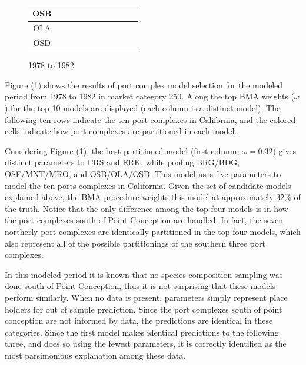 \documentclass[12pt]{article}
\begin{document}
\begin{figure}[h!]
\begin{tabular}{|c|c|c|c|c|c|c|c|c|c|c|}
        OSB&\cellcolor[HTML]{FF7F00}&\cellcolor[HTML]{FF7F00}&\cellcolor[HTML]{FF7F00}&\cellcolor[HTML]{FF7F00}&\cellcolor[HTML]{FF7F00}&\cellcolor[HTML]{FF7F00}&\cellcolor[HTML]{FF7F00}&\cellcolor[HTML]{FF7F00}&\cellcolor[HTML]{984EA3}&\cellcolor[HTML]{FF7F00} \\ \hline%
        OLA&\cellcolor[HTML]{FF7F00}&\cellcolor[HTML]{FFFF33}&\cellcolor[HTML]{FF7F00}&\cellcolor[HTML]{FFFF33}&\cellcolor[HTML]{FF7F00}&\cellcolor[HTML]{FFFF33}&\cellcolor[HTML]{FFFF33}&\cellcolor[HTML]{FFFF33}&\cellcolor[HTML]{FF7F00}&\cellcolor[HTML]{FF7F00} \\ \hline%
        OSD&\cellcolor[HTML]{FF7F00}&\cellcolor[HTML]{FFFF33}&\cellcolor[HTML]{FFFF33}&\cellcolor[HTML]{A65628}&\cellcolor[HTML]{FFFF33}&\cellcolor[HTML]{FFFF33}&\cellcolor[HTML]{A65628}&\cellcolor[HTML]{FFFF33}&\cellcolor[HTML]{FFFF33}&\cellcolor[HTML]{FF7F00} \\ \hline%
\end{tabular}
\caption{1978 to 1982}
\label{colorTab78}
\end{figure}

Figure (\ref{colorTab78}) shows the results of port complex model
selection for the modeled period from 1978 to 1982 in market category
250. Along the top BMA weights (\(\omega\)) for the top 10 models are
displayed (each column is a distinct model). The following ten rows
indicate the ten port complexes in California, and the colored cells
indicate how port complexes are partitioned in each model.

Considering Figure (\ref{colorTab78}), the best partitioned model
(first column, \(\omega=0.32\)) gives distinct parameters to CRS and
ERK, while pooling BRG/BDG, OSF/MNT/MRO, and OSB/OLA/OSD. This model
uses five parameters to model the ten ports complexes in California.
Given the set of candidate models explained above, the BMA procedure
weights this model at approximately 32\% of the truth. Notice that the
only difference among the top four models is in how the port complexes
south of Point Conception are handled. In fact, the seven northerly port
complexes are identically partitioned in the top four models, which also
represent all of the possible partitionings of the southern three port
complexes.

In this modeled period it is known that no species composition sampling
was done south of Point Conception, thus it is not surprising that these
models perform similarly. When no data is present, parameters simply
represent place holders for out of sample prediction. Since the port
complexes south of point conception are not informed by data, the
predictions are identical in these categories. Since the first model
makes identical predictions to the following three, and does so using
the fewest parameters, it is correctly identified as the most
parsimonious explanation among these data.
\end{document}
